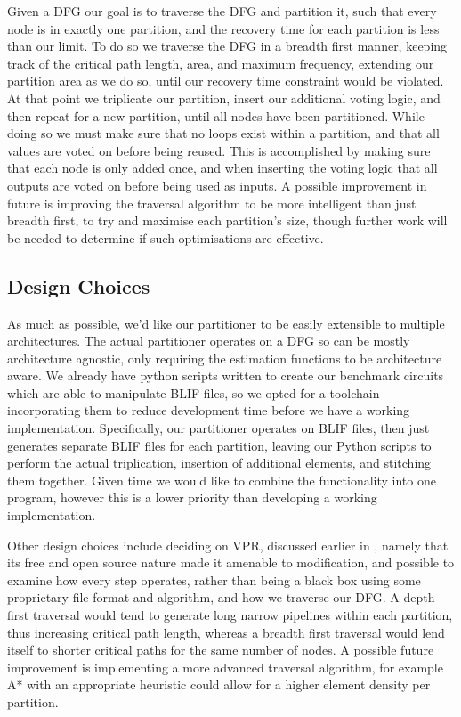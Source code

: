 \documentclass[12pt,drafta4paper,oneside]{memoir} %
\begin{document}
Given a \ac{DFG} our goal is to traverse the \ac{DFG} and partition it, such that every node is in exactly one partition, and the recovery time for each partition is less than our limit.
To do so we traverse the \ac{DFG} in a breadth first manner, keeping track of the critical path length, area, and maximum frequency, extending our partition area as we do so, until our recovery time constraint would be violated. At that point we triplicate our partition, insert our additional voting logic, and then repeat for a new partition, until all nodes have been partitioned.  While doing so we must make sure that no loops exist within a partition, and that all values are voted on before being reused. This is accomplished by making sure that each node is only added once, and when inserting the voting logic that all outputs are voted on before being used as inputs.
A possible improvement in future is improving the traversal algorithm to be more intelligent than just breadth first, to try and maximise each partition's size, though further work will be needed to determine if such optimisations are effective.

\subsection{Design Choices}
As much as possible, we'd like our partitioner to be easily extensible to multiple architectures. The actual partitioner operates on a \ac{DFG} so can be mostly architecture agnostic, only requiring the estimation functions to be architecture aware.
We already have python scripts written to create our benchmark circuits which are able to manipulate \ac{BLIF} files, so we opted for a toolchain incorporating them to reduce development time before we have a working implementation. Specifically, our partitioner operates on \ac{BLIF} files, then just generates separate \ac{BLIF} files for each partition, leaving our Python scripts to perform the actual triplication, insertion of additional elements, and stitching them together. Given time we would like to combine the functionality into one program, however this is a lower priority than developing a working implementation.

Other design choices include deciding on \ac{VPR}, discussed earlier in , namely that its free and open source nature made it amenable to modification, and possible to examine how every step operates, rather than being a black box using some proprietary file format and algorithm, and how we traverse our \ac{DFG}. A depth first traversal would tend to generate long narrow pipelines within each partition, thus increasing critical path length, whereas a breadth first traversal would lend itself to shorter critical paths for the same number of nodes. A possible future improvement is implementing a more advanced traversal algorithm, for example A* with an appropriate heuristic could allow for a higher element density per partition.
\end{document}
